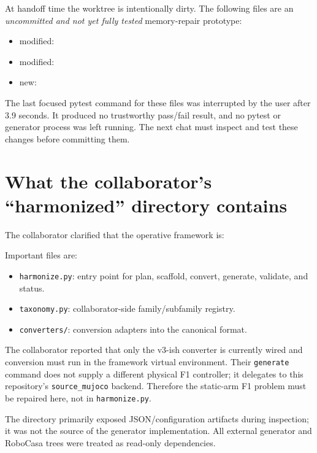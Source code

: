 \documentclass[11pt]{article}
\begin{document}
At handoff time the worktree is intentionally dirty.  The following files are
an \emph{uncommitted and not yet fully tested} memory-repair prototype:

\begin{itemize}
  \item modified: 
  \item modified: 
  \item new: 
\end{itemize}

The last focused pytest command for these files was interrupted by the user
after 3.9 seconds.  It produced no trustworthy pass/fail result, and no pytest
or generator process was left running.  The next chat must inspect and test
these changes before committing them.

\section{What the collaborator's ``harmonized'' directory contains}

The collaborator clarified that the operative framework is:


Important files are:

\begin{itemize}
  \item \texttt{harmonize.py}: entry point for plan, scaffold, convert, generate,
        validate, and status.
  \item \texttt{taxonomy.py}: collaborator-side family/subfamily registry.
  \item \texttt{converters/}: conversion adapters into the canonical format.
\end{itemize}

The collaborator reported that only the v3-ish converter is currently wired
and conversion must run in the framework virtual environment.  Their
\texttt{generate} command does not supply a different physical F1 controller;
it delegates to this repository's \texttt{source\_mujoco} backend.  Therefore
the static-arm F1 problem must be repaired here, not in
\texttt{harmonize.py}.

The directory
primarily exposed JSON/configuration artifacts during inspection; it was not
the source of the generator implementation.  All external generator and
RoboCasa trees were treated as read-only dependencies.
\end{document}
